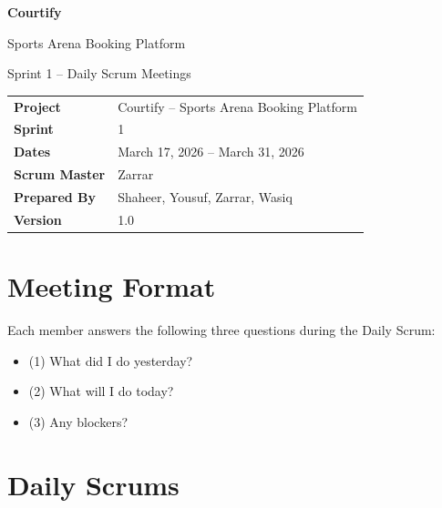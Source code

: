 \documentclass[12pt,a4paper]{article}
\begin{document}

\begin{titlepage}
\centering
\vspace*{2cm}
{\Huge\bfseries\color{sectionblue} Courtify}\par
\vspace{0.4cm}
{\Large Sports Arena Booking Platform}\par
\vspace{1.5cm}
{\huge Sprint 1 -- Daily Scrum Meetings}\par
\vspace{2cm}
\renewcommand{\arraystretch}{1.5}
\begin{tabular}{>{\bfseries}l p{10cm}}
Project     & Courtify -- Sports Arena Booking Platform \\
Sprint      & 1 \\
Dates       & March 17, 2026 -- March 31, 2026 \\
Scrum Master& Zarrar \\
Prepared By & Shaheer, Yousuf, Zarrar, Wasiq \\
Version     & 1.0 \\
\end{tabular}
\end{titlepage}

\newpage

\section{Meeting Format}

Each member answers the following three questions during the Daily Scrum:
\begin{itemize}[noitemsep]
    \item (1) What did I do yesterday?
    \item (2) What will I do today?
    \item (3) Any blockers?
\end{itemize}

\vspace{1.5em}

\section{Daily Scrums}
\end{document}
